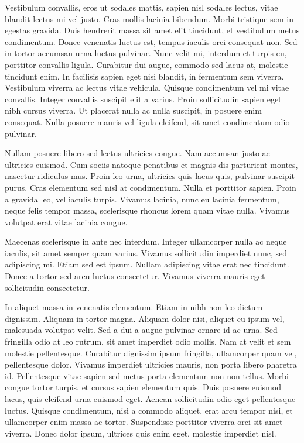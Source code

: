 \documentclass[journal]{IEEEtran}
\begin{document}
Vestibulum convallis, eros ut sodales mattis, sapien nisl sodales lectus, vitae blandit lectus mi vel justo. Cras mollis lacinia bibendum. Morbi tristique sem in egestas gravida. Duis hendrerit massa sit amet elit tincidunt, et vestibulum metus condimentum. Donec venenatis luctus est, tempus iaculis orci consequat non. Sed in tortor accumsan urna luctus pulvinar. Nunc velit mi, interdum et turpis eu, porttitor convallis ligula. Curabitur dui augue, commodo sed lacus at, molestie tincidunt enim. In facilisis sapien eget nisi blandit, in fermentum sem viverra. Vestibulum viverra ac lectus vitae vehicula. Quisque condimentum vel mi vitae convallis. Integer convallis suscipit elit a varius. Proin sollicitudin sapien eget nibh cursus viverra. Ut placerat nulla ac nulla suscipit, in posuere enim consequat. Nulla posuere mauris vel ligula eleifend, sit amet condimentum odio pulvinar.

Nullam posuere libero sed lectus ultricies congue. Nam accumsan justo ac ultricies euismod. Cum sociis natoque penatibus et magnis dis parturient montes, nascetur ridiculus mus. Proin leo urna, ultricies quis lacus quis, pulvinar suscipit purus. Cras elementum sed nisl at condimentum. Nulla et porttitor sapien. Proin a gravida leo, vel iaculis turpis. Vivamus lacinia, nunc eu lacinia fermentum, neque felis tempor massa, scelerisque rhoncus lorem quam vitae nulla. Vivamus volutpat erat vitae lacinia congue.

Maecenas scelerisque in ante nec interdum. Integer ullamcorper nulla ac neque iaculis, sit amet semper quam varius. Vivamus sollicitudin imperdiet nunc, sed adipiscing mi. Etiam sed est ipsum. Nullam adipiscing vitae erat nec tincidunt. Donec a tortor sed arcu luctus consectetur. Vivamus viverra mauris eget sollicitudin consectetur.

In aliquet massa in venenatis elementum. Etiam in nibh non leo dictum dignissim. Aliquam in tortor magna. Aliquam dolor nisi, aliquet eu ipsum vel, malesuada volutpat velit. Sed a dui a augue pulvinar ornare id ac urna. Sed fringilla odio at leo rutrum, sit amet imperdiet odio mollis. Nam at velit et sem molestie pellentesque. Curabitur dignissim ipsum fringilla, ullamcorper quam vel, pellentesque dolor. Vivamus imperdiet ultricies mauris, non porta libero pharetra id. Pellentesque vitae sapien sed metus porta elementum non non tellus. Morbi congue tortor turpis, et cursus sapien elementum quis. Duis posuere euismod lacus, quis eleifend urna euismod eget. Aenean sollicitudin odio eget pellentesque luctus. Quisque condimentum, nisi a commodo aliquet, erat arcu tempor nisi, et ullamcorper enim massa ac tortor. Suspendisse porttitor viverra orci sit amet viverra. Donec dolor ipsum, ultrices quis enim eget, molestie imperdiet nisl.
\end{document}
